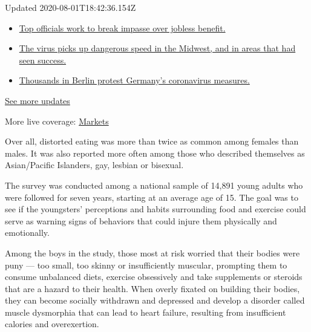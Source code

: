 Updated 2020-08-01T18:42:36.154Z

\begin{itemize}
\tightlist
\item
  \href{https://www.nytimes.com/2020/08/01/world/coronavirus-covid-19.html?action=click\&pgtype=Article\&state=default\&region=MAIN_CONTENT_1\&context=storylines_live_updates\#link-3ac56579}{Top
  officials work to break impasse over jobless benefit.}
\item
  \href{https://www.nytimes.com/2020/08/01/world/coronavirus-covid-19.html?action=click\&pgtype=Article\&state=default\&region=MAIN_CONTENT_1\&context=storylines_live_updates\#link-8796723}{The
  virus picks up dangerous speed in the Midwest, and in areas that had
  seen success.}
\item
  \href{https://www.nytimes.com/2020/08/01/world/coronavirus-covid-19.html?action=click\&pgtype=Article\&state=default\&region=MAIN_CONTENT_1\&context=storylines_live_updates\#link-25930521}{Thousands
  in Berlin protest Germany's coronavirus measures.}
\end{itemize}

\href{https://www.nytimes.com/2020/08/01/world/coronavirus-covid-19.html?action=click\&pgtype=Article\&state=default\&region=MAIN_CONTENT_1\&context=storylines_live_updates}{See
more updates}

More live coverage:
\href{https://www.nytimes.com/live/2020/07/31/business/stock-market-today-coronavirus?action=click\&pgtype=Article\&state=default\&region=MAIN_CONTENT_1\&context=storylines_live_updates}{Markets}

Over all, distorted eating was more than twice as common among females
than males. It was also reported more often among those who described
themselves as Asian/Pacific Islanders, gay, lesbian or bisexual.

The survey was conducted among a national sample of 14,891 young adults
who were followed for seven years, starting at an average age of 15. The
goal was to see if the youngsters' perceptions and habits surrounding
food and exercise could serve as warning signs of behaviors that could
injure them physically and emotionally.

Among the boys in the study, those most at risk worried that their
bodies were puny --- too small, too skinny or insufficiently muscular,
prompting them to consume unbalanced diets, exercise obsessively and
take supplements or steroids that are a hazard to their health. When
overly fixated on building their bodies, they can become socially
withdrawn and depressed and develop a disorder called muscle dysmorphia
that can lead to heart failure, resulting from insufficient calories and
overexertion.

